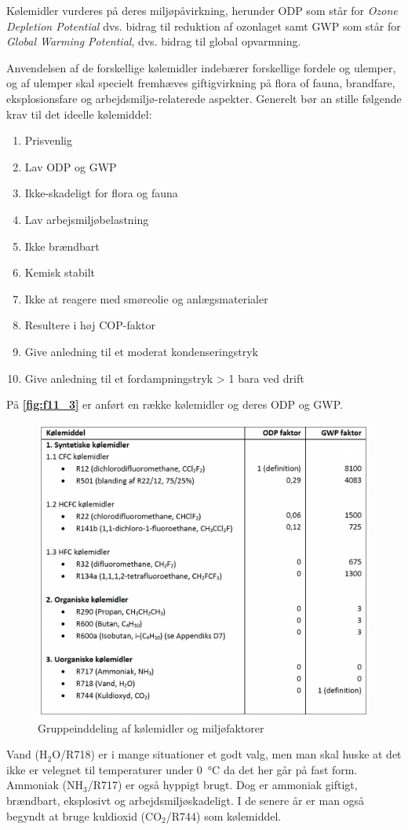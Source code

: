 Kølemidler vurderes på deres miljøpåvirkning, herunder ODP som står for \textit{Ozone Depletion Potential} dvs. bidrag til reduktion af ozonlaget samt GWP som står for \textit{Global Warming Potential}, dvs. bidrag til global opvarmning.

Anvendelsen af de forskellige kølemidler indebærer forskellige fordele og ulemper, og af ulemper skal specielt fremhæves giftigvirkning på flora of fauna, brandfare, eksplosionsfare og arbejdsmiljø-relaterede aspekter. Generelt bør an stille følgende krav til det ideelle kølemiddel:
\begin{enumerate}
  \item Prisvenlig
  \item Lav ODP og GWP
  \item Ikke-skadeligt for flora og fauna
  \item Lav arbejsmiljøbelastning
  \item Ikke brændbart
  \item Kemisk stabilt
  \item Ikke at reagere med smøreolie og anlægsmaterialer
  \item Resultere i høj COP-faktor
  \item Give anledning til et moderat kondenseringstryk
  \item Give anledning til et fordampningstryk > 1 bara ved drift
\end{enumerate}
På \textbf{\autoref{fig:f11_3}} er anført en række kølemidler og deres ODP og GWP.
\begin{figure} [ht]
  \centering
  \includegraphics[width=0.3\linewidth]{./figures/f11_3.png}
  \caption{Gruppeinddeling af kølemidler og miljøfaktorer}
  \label{fig:f11_3}
\end{figure}

Vand ($\mathrm{H}_2 \mathrm{O}$/R718) er i mange situationer et godt valg, men man skal huske at det ikke er velegnet til temperaturer under \qty{0}{\celsius} da det her går på fast form. Ammoniak ($\mathrm{NH}_3$/R717) er også hyppigt brugt. Dog er ammoniak giftigt, brændbart, eksplosivt og arbejdsmiljøskadeligt. I de senere år er man også begyndt at bruge kuldioxid ($\mathrm{CO}_2$/R744) som kølemiddel.


